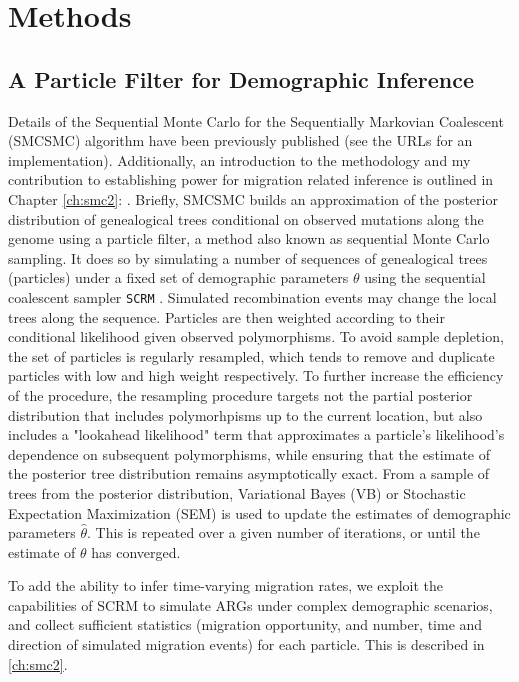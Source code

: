 \section{Methods}

\subsection{A Particle Filter for Demographic Inference} Details of the Sequential Monte Carlo for the Sequentially Markovian Coalescent (SMCSMC) algorithm have been previously published \cite{Henderson2018} (see the URLs for an implementation). Additionally, an introduction to the methodology and my contribution to establishing power for migration related inference is outlined in Chapter \ref{ch:smc2}: . Briefly, SMCSMC builds an approximation of the posterior distribution of genealogical trees conditional on observed mutations along the genome using a particle filter, a method also known as sequential Monte Carlo sampling. It does so by simulating a number of sequences of genealogical trees (particles) under a fixed set of demographic parameters $\theta$ using the sequential coalescent sampler {\tt SCRM} \cite{Staab2015}. Simulated recombination events may change the local trees along the sequence. Particles are then weighted according to their conditional likelihood given observed polymorphisms.  To avoid sample depletion, the set of particles is regularly resampled, which tends to remove and duplicate particles with low and high weight respectively.  To further increase the efficiency of the procedure, the resampling procedure targets not the partial posterior distribution that includes polymorhpisms up to the current location, but also includes a "lookahead likelihood" term that approximates a particle's likelihood's dependence on subsequent polymorphisms, while ensuring that the estimate of the posterior tree distribution remains asymptotically exact.  From a sample of trees from the posterior distribution, Variational Bayes (VB) or Stochastic Expectation Maximization (SEM) is used to update the estimates of demographic parameters $\hat{\theta}$. This is repeated over a given number of iterations, or until the estimate of $\theta$ has converged.

To add the ability to infer time-varying migration rates, we exploit the capabilities of SCRM to simulate ARGs under complex demographic scenarios, and collect sufficient statistics (migration opportunity, and number, time and direction of simulated migration events) for each particle. This is described in \autoref{ch:smc2}.


